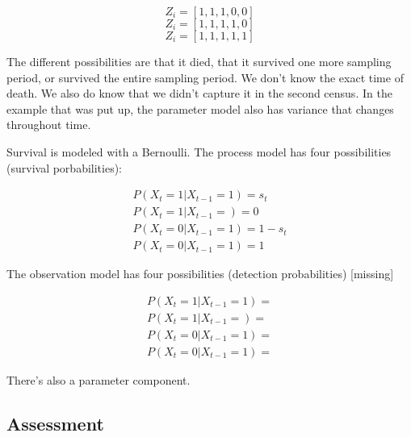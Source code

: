 \documentclass[12pt, oneside]{article}   	%
\begin{document}
$$Z_i = [1,1,1,0,0]$$
$$Z_i = [1,1,1,1,0]$$
$$Z_i = [1,1,1,1,1]$$

The different possibilities are that it died, that it survived one more sampling period, or survived the entire sampling period. We don't know the exact time of death. We also do know that we didn't capture it in the second census. In the example that was put up, the parameter model also has variance that changes throughout time. 

Survival is modeled with a Bernoulli. The process model has four possibilities (survival porbabilities):

\begin{align}
P(X_t = 1 | X_{t-1} = 1) = s_t \\
P(X_t = 1 | X_{t-1} = ) = 0 \\
P(X_t = 0 | X_{t-1} = 1) = 1- s_t \\
P(X_t = 0 | X_{t-1} = 1) = 1
\end{align}

The observation model has four possibilities (detection probabilities) [missing]

\begin{align}
P(X_t = 1 | X_{t-1} = 1) =  \\
P(X_t = 1 | X_{t-1} = ) = \\
P(X_t = 0 | X_{t-1} = 1) =  \\
P(X_t = 0 | X_{t-1} = 1) = 
\end{align}

There's also a parameter component.

\subsection{Assessment}
\end{document}
